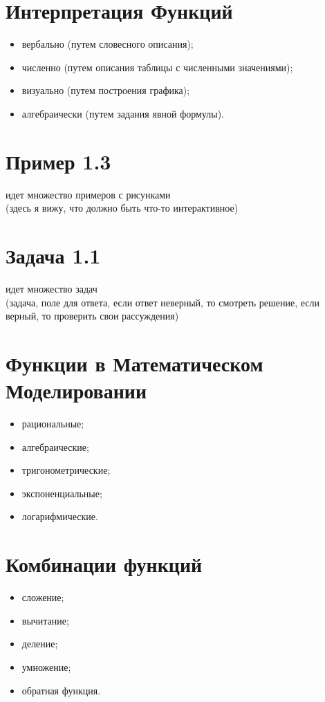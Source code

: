 \documentclass[a4paper,14pt]{report}
\begin{document}
\section*{ Интерпретация Функций}
\begin{itemize}
	\item вербально (путем словесного описания);
	\item численно (путем описания таблицы с численными значениями);
	\item визуально (путем построения графика);
	\item алгебраически (путем задания явной формулы).
\end{itemize}

\section*{ Пример 1.3}
идет множество примеров с рисунками\\
(здесь я вижу, что должно быть что-то интерактивное)

\section*{ Задача 1.1}
идет множество задач\\
(задача, поле для ответа, если ответ неверный, то смотреть решение, если верный, то проверить свои рассуждения)
\section*{ Функции в Математическом Моделировании}
\begin{itemize}
	\item рациональные;
	\item алгебраические;
	\item тригонометрические;
	\item экспоненциальные;
	\item логарифмические.
\end{itemize}

\section*{ Комбинации функций}
\begin{itemize}
	\item сложение;
	\item вычитание;
	\item деление;
	\item умножение;
	\item обратная функция.
\end{itemize}
\end{document}
